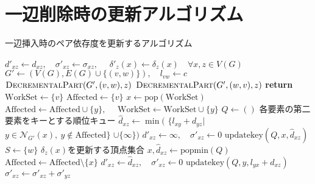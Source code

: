 \section{一辺削除時の更新アルゴリズム}
\label{sect:app-decremental-algorithm}
\begin{algorithm}[H]
  \caption{一辺挿入時のペア依存度を更新するアルゴリズム}
  \label{algo:decremental-algorithm}
  \begin{multicols}{2}
    \begin{algorithmic}[1]
      \State $d'_{xz}\gets d_{xz},\quad\sigma'_{xz}\gets \sigma_{xz},\quad$
      $\delta'_z(x)\gets \delta_z(x)\quad \forall x,z\in V(G)$
      \State $G'\gets(V(G),E(G)\cup\{(v,w)\}),\quad l_{vw}\gets c$
      \State $\textsc{DecrementalPart}(G',(v,w),z)$
      \Else
      \State $\textsc{DecrementalPart}(G',(w,v),z)$
      \EndIf
      \EndFor
      \EndProcedure
      \State \textbf{return}
      \EndIf
      \State $\mathrm{WorkSet}\gets\{v\}$
      \State $\mathrm{Affected}\gets\{v\}$
      \State $x\gets\mathrm{pop}(\mathrm{WorkSet})$
      \State $\mathrm{Affected}\gets\mathrm{Affected}\cup\{y\},\quad$
      $\mathrm{WorkSet}\gets\mathrm{WorkSet}\cup\{y\}$
      \EndIf
      \EndFor
      \EndWhile
      \State $Q\gets()$
      \Comment 各要素の第二要素をキーとする順位キュー
      \State $\hat{d}_{xz}\gets\min($
      $\{l_{xy}+d_{yz}\vert$
      $y\in\mathcal{N}_{G'}(x),\:y\notin\mathrm{Affected}\}$
      $\cup\{\infty\})$
      \State $d'_{xz}\gets\infty,\quad\sigma'_{xz}\gets 0$
      \Else
      \State $\mathrm{updatekey}(Q, x, \hat{d}_{xz})$
      \EndIf
      \EndFor
      \State $S\gets\{w\}$
      \Comment $\delta_z(x)$を更新する頂点集合
      \State $x,\hat{d}_{xz}\gets\mathrm{popmin}(Q)$
      \State $\mathrm{Affected}\gets\mathrm{Affected}\setminus\{x\}$
      \State $d'_{xz}\gets\hat{d}_{xz},\quad\sigma'_{xz}\gets 0$
      \State $\mathrm{updatekey}(Q,y,l_{yx}+d_{xz})$
      \EndIf
      \State $\sigma'_{xz}\gets\sigma'_{xz}+\sigma'_{yz}$
      \EndIf

\end{algorithmic}
\end{multicols}
\end{algorithm}
